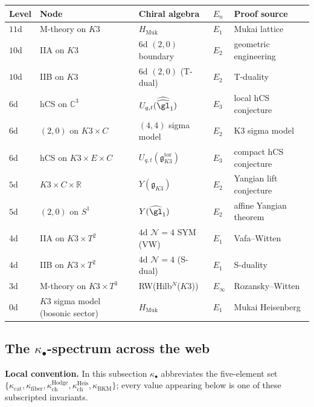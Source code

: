 \begin{center}
\renewcommand{\arraystretch}{1.3}
\begin{tabular}{lllll}
\hline
\textbf{Level} & \textbf{Node} & \textbf{Chiral algebra} & \textbf{$E_n$} & \textbf{Proof source} \\
\hline
$11$d & M-theory on $K3$ & $H_{\mathrm{Muk}}$ & $E_1$ & Mukai lattice \\
$10$d & IIA on $K3$ & $6$d $(2{,}0)$ boundary & $E_2$ & geometric engineering \\
$10$d & IIB on $K3$ & $6$d $(2{,}0)$ (T-dual) & $E_2$ & T-duality \\
$6$d & hCS on $\mathbb{C}^3$ & $U_{q,t}(\widehat{\widehat{\gl}}_1)$ & $E_3$ & local hCS conjecture \\
$6$d & $(2{,}0)$ on $K3 \times C$ & $(4{,}4)$ sigma model & $E_2$ & K3 sigma model \\
$6$d & hCS on $K3 \times E \times C$ & $U_{q,t}(\mathfrak{g}_{K3}^{\mathrm{tor}})$ & $E_3$ & compact hCS conjecture \\
$5$d & $K3 \times C \times \mathbb{R}$ & $Y(\mathfrak{g}_{K3})$ & $E_2$ & Yangian lift conjecture \\
$5$d & $(2{,}0)$ on $S^1$ & $Y(\widehat{\gl}_1)$ & $E_2$ & affine Yangian theorem \\
$4$d & IIA on $K3 \times T^2$ & $4$d $\mathcal{N}=4$ SYM (VW) & $E_1$ & Vafa--Witten \\
$4$d & IIB on $K3 \times T^2$ & $4$d $\mathcal{N}=4$ (S-dual) & $E_1$ & S-duality \\
$3$d & M-theory on $K3 \times T^3$ & RW(Hilb$^N$($K3$)) & $E_\infty$ & Rozansky--Witten \\
$0$d & $K3$ sigma model (bosonic sector) & $H_{\mathrm{Muk}}$ & $E_1$ & Mukai Heisenberg \\
\hline
\end{tabular}
\end{center}

\subsection{The \texorpdfstring{$\kappa_\bullet$}{kappa-.}-spectrum across the web}
\label{sec:kappa-spectrum-web}

\noindent\textbf{Local convention.} In this subsection $\kappa_\bullet$
abbreviates the five-element set
$\{\kappa_{\mathrm{cat}}, \kappa_{\mathrm{fiber}},
\kappa_{\mathrm{ch}}^{\mathrm{Hodge}}, \kappa_{\mathrm{ch}}^{\mathrm{Heis}},
 \kappa_{\mathrm{BKM}}\}$; every value appearing below is one of
these subscripted invariants.

